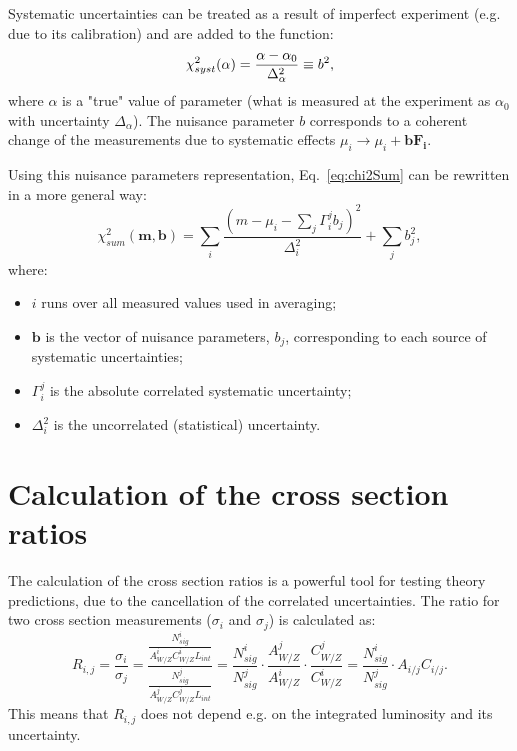 Systematic uncertainties can be treated as a result of imperfect experiment (e.g. due to its calibration) and are added to the \chiD function:
\begin{equation}
\chi^2_{syst}(\alpha) = \frac{\alpha-\alpha_0}{\Delta_{\alpha}^2}\equiv b^2,
\end{equation}
where $\alpha$ is a "true" value of parameter (what is measured at the experiment as $\alpha_0$ with uncertainty $\Delta_{\alpha}$). The nuisance parameter $b$ corresponds to a coherent change of the measurements due to systematic effects $\mu_i \to \mu_i+\mathbf{bF_i}$. 

Using this nuisance parameters representation, Eq.~\ref{eq:chi2Sum} can be rewritten in a more general way:
\begin{equation}\label{Eq:ChiDParam}
\chi^{2}_{sum}(\mathbf{m},\mathbf{b})=\sum_{i} \frac{(m-\mu_i-\sum_j\Gamma_i^jb_j)^2}{\Delta_i^2}+\sum_j b_j^2, 
\end{equation}
where:
\begin{itemize}
\item $i$ runs over all measured values used in averaging;
\item $\mathbf{b}$ is the vector of nuisance parameters, $b_j$, corresponding to each source of systematic uncertainties;
\item $\Gamma_i^j$ is the absolute correlated systematic uncertainty;
\item $\Delta_i^2$ is the uncorrelated (statistical) uncertainty.
\end{itemize}


\section{Calculation of the cross section ratios}\label{sec:Rat}

The calculation of the cross section ratios is a powerful tool for testing theory predictions, due to the cancellation of the correlated uncertainties. The ratio for two cross section measurements ($\sigma_i$ and $\sigma_j$) is calculated as:
\begin{equation}
R_{i,j}=\frac{\sigma_i}{\sigma_j}=\frac{\frac{N^{i}_{sig}}{A^{i}_{W/Z}C^{i}_{W/Z}L_{int}}}{ \frac{N^{j}_{sig}}{A^{j}_{W/Z}C^{j}_{W/Z}L_{int}}}
=\frac{N^{i}_{sig}}{N^{j}_{sig}}\cdot \frac{A^{j}_{W/Z}}{A^{i}_{W/Z}} \cdot \frac{C^{j}_{W/Z}}{C^{i}_{W/Z}}=\frac{N^{i}_{sig}}{N^{j}_{sig}}\cdot A_{i/j} C_{i/j}.
\end{equation}
This means that $R_{i,j}$ does not depend e.g. on the integrated luminosity and its uncertainty.

